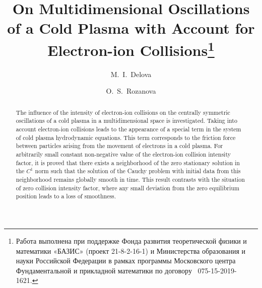 \begin{englishtitle} %
\title{On Multidimensional Oscillations of a Cold Plasma with Account for Electron-ion Collisions\thanks{Работа выполнена при поддержке Фонда развития теоретической физики и математики «БАЗИС» (проект 21-8-2-16-1) и Министерства образования и науки Российской Федерации
в рамках программы Московского центра
Фундаментальной и прикладной математики по договору \textnumero~075-15-2019-1621.}}
\author{M.~I.~Delova
  \and
  O.~S.~Rozanova
}

\maketitle

\begin{abstract}
The influence of the intensity of electron-ion collisions on the centrally symmetric oscillations of a cold plasma in a multidimensional space is investigated. Taking into account electron-ion collisions leads to the appearance of a special term in the system of cold plasma hydrodynamic equations. This term corresponds to the friction force between particles arising from the movement of electrons in a cold plasma. For arbitrarily small constant non-negative value of the electron-ion collision intensity factor, it is proved that there exists a neighborhood of the zero stationary solution in the $C^1$ norm such that the solution of the Cauchy problem with initial data from this neighborhood remains globally smooth in time. This result contrasts with the situation of zero collision intensity factor, where any small deviation from the zero equilibrium position leads to a loss of smoothness.
\end{abstract}
\end{englishtitle}


\iffalse

%
%

